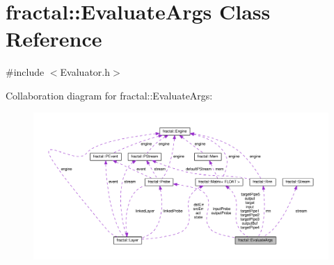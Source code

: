 \hypertarget{classfractal_1_1EvaluateArgs}{\section{fractal\+:\+:Evaluate\+Args Class Reference}
\label{classfractal_1_1EvaluateArgs}
}


{\ttfamily \#include $<$Evaluator.\+h$>$}



Collaboration diagram for fractal\+:\+:Evaluate\+Args\+:\nopagebreak
\begin{figure}[H]
\begin{center}
\leavevmode
\includegraphics[width=350pt]{d2/d95/classfractal_1_1EvaluateArgs__coll__graph}
\end{center}
\end{figure}
